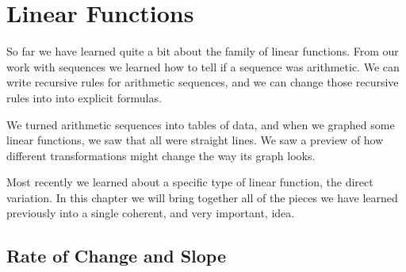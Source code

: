 \chapter{Linear Functions}
\label{ch:linear}



So far we have learned quite a bit about the family of linear functions. From our work with sequences we learned how to tell if a sequence was arithmetic. We can write recursive rules for arithmetic sequences, and we can change those recursive rules into into explicit formulas.

We turned arithmetic sequences into tables of data, and when we graphed some linear functions, we saw that all were straight lines. We saw a preview of how different transformations might change the way its graph looks.

Most recently we learned about a specific type of linear function, the direct variation. In this chapter we will bring together all of the pieces we have learned previously into a single coherent, and very important, idea.

\section{Rate of Change and Slope}
\label{sec:rateofchange}

\begin{boxedexplore}
\end{boxedexplore}

